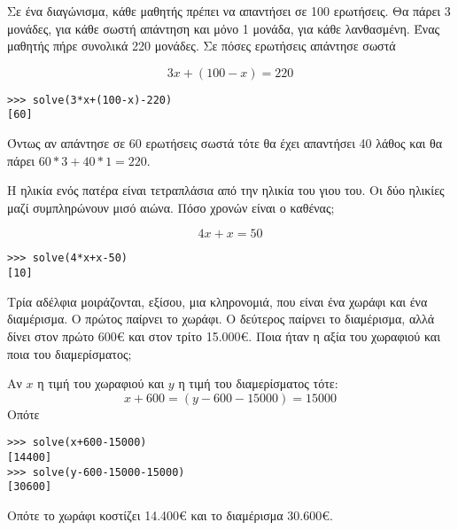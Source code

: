 \begin{exercise}
Σε ένα διαγώνισμα, κάθε μαθητής πρέπει να απαντήσει σε 100 ερωτήσεις. Θα πάρει
3 μονάδες, για κάθε σωστή απάντηση και μόνο 1 μονάδα, για κάθε λανθασμένη. Ένας
μαθητής πήρε συνολικά 220 μονάδες. Σε πόσες ερωτήσεις απάντησε σωστά
\end{exercise}
$$3x+(100-x)=220$$
\begin{lstlisting}
>>> solve(3*x+(100-x)-220)
[60]
\end{lstlisting}
Όντως αν απάντησε σε 60 ερωτήσεις σωστά τότε θα έχει απαντήσει 40 λάθος και θα πάρει $60*3+40*1=220$.

\begin{exercise}
Η ηλικία ενός πατέρα είναι τετραπλάσια από την ηλικία του γιου του. Οι δύο ηλικίες
μαζί συμπληρώνουν μισό αιώνα. Πόσο χρονών είναι ο καθένας;
\end{exercise}
$$4x+x=50$$
\begin{lstlisting}
>>> solve(4*x+x-50)
[10]
\end{lstlisting}
\begin{exercise}
Τρία αδέλφια μοιράζονται, εξίσου, μια κληρονομιά, που είναι ένα χωράφι και ένα
διαμέρισμα. Ο πρώτος παίρνει το χωράφι. Ο δεύτερος παίρνει το διαμέρισμα, αλλά
δίνει στον πρώτο 600€ και στον τρίτο 15.000€. Ποια ήταν η αξία του χωραφιού και
ποια του διαμερίσματος;
\end{exercise}
Αν $x$ η τιμή του χωραφιού και $y$ η τιμή του διαμερίσματος τότε:
$$x+600=(y-600-15000)=15000$$
Οπότε
\begin{lstlisting}
>>> solve(x+600-15000)
[14400]
>>> solve(y-600-15000-15000)
[30600]
\end{lstlisting}
Οπότε το χωράφι κοστίζει 14.400€ και το διαμέρισμα 30.600€.
